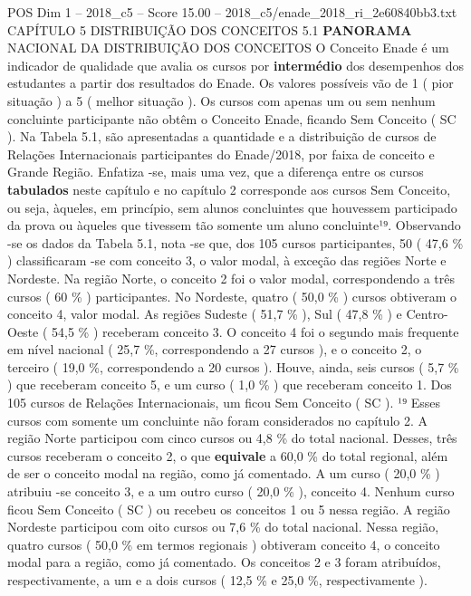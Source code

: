 \begin{textsample}{POS Dim 1 – 2018\_c5 – Score 15.00 – 2018\_c5/enade\_2018\_ri\_2e60840bb3.txt}  \label{ex:f1_pos_063}
CAPÍTULO 5 DISTRIBUIÇÃO DOS CONCEITOS 5.1 \textbf{PANORAMA} NACIONAL DA DISTRIBUIÇÃO DOS CONCEITOS O Conceito Enade é um indicador de qualidade que avalia os cursos por \textbf{intermédio} dos desempenhos dos estudantes a partir dos resultados do Enade.
Os valores possíveis vão de 1 ( pior situação ) a 5 ( melhor situação ).
Os cursos com apenas um ou sem nenhum concluinte participante não obtêm o Conceito Enade, ficando Sem Conceito ( SC ).
Na Tabela 5.1, são apresentadas a quantidade e a distribuição de cursos de Relações Internacionais participantes do Enade/2018, por faixa de conceito e Grande Região.
Enfatiza -se, mais uma vez, que a diferença entre os cursos \textbf{tabulados} neste capítulo e no capítulo 2 corresponde aos cursos Sem Conceito, ou seja, àqueles, em princípio, sem alunos concluintes que houvessem participado da prova ou àqueles que tivessem tão somente um aluno concluinte¹⁹.
Observando -se os dados da Tabela 5.1, nota -se que, dos 105 cursos participantes, 50 ( 47,6 \% ) classificaram -se com conceito 3, o valor modal, à exceção das regiões Norte e Nordeste.
Na região Norte, o conceito 2 foi o valor modal, correspondendo a três cursos ( 60 \% ) participantes.
No Nordeste, quatro ( 50,0 \% ) cursos obtiveram o conceito 4, valor modal.
As regiões Sudeste ( 51,7 \% ), Sul ( 47,8 \% ) e Centro-Oeste ( 54,5 \% ) receberam conceito 3.
O conceito 4 foi o segundo mais frequente em nível nacional ( 25,7 \%, correspondendo a 27 cursos ), e o conceito 2, o terceiro ( 19,0 \%, correspondendo a 20 cursos ).
Houve, ainda, seis cursos ( 5,7 \% ) que receberam conceito 5, e um curso ( 1,0 \% ) que receberam conceito 1.
Dos 105 cursos de Relações Internacionais, um ficou Sem Conceito ( SC ). ¹⁹ Esses cursos com somente um concluinte não foram considerados no capítulo 2.
A região Norte participou com cinco cursos ou 4,8 \% do total nacional.
Desses, três cursos receberam o conceito 2, o que \textbf{equivale} a 60,0 \% do total regional, além de ser o conceito modal na região, como já comentado.
A um curso ( 20,0 \% ) atribuiu -se conceito 3, e a um outro curso ( 20,0 \% ), conceito 4.
Nenhum curso ficou Sem Conceito ( SC ) ou recebeu os conceitos 1 ou 5 nessa região.
A região Nordeste participou com oito cursos ou 7,6 \% do total nacional.
Nessa região, quatro cursos ( 50,0 \% em termos regionais ) obtiveram conceito 4, o conceito modal para a região, como já comentado.
Os conceitos 2 e 3 foram atribuídos, respectivamente, a um e a dois cursos ( 12,5 \% e 25,0 \%, respectivamente ).

\end{textsample}
